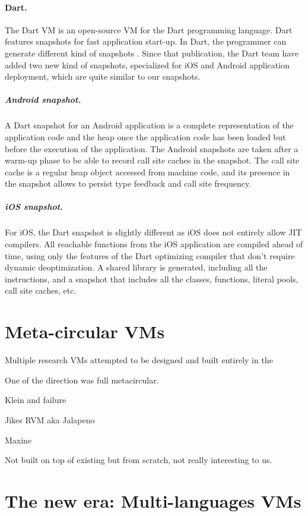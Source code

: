 \documentclass[a4paper,12pt,twoside]{../includes/ThesisStyle}
\begin{document}
\paragraph{Dart.}
The Dart VM is an open-source VM for the Dart programming language. Dart features snapshots for fast application start-up. In Dart, the programmer can generate different kind of snapshots \cite{Anna13a}. Since that publication, the Dart team have added two new kind of snapshots, specialized for iOS and Android application deployment, which are quite similar to our snapshots.

\subparagraph{Android snapshot.} A Dart snapshot for an Android application is a complete representation of the application code and the heap once the application code has been loaded but before the execution of the application. The Android snapshots are taken after a warm-up phase to be able to record call site caches in the snapshot. The call site cache is a regular heap object accessed from machine code, and its presence in the snapshot allows to persist type feedback and call site frequency.

\subparagraph{iOS snapshot.} For iOS, the Dart snapshot is slightly different as iOS does not entirely allow JIT compilers. All reachable functions from the iOS application are compiled ahead of time, using only the features of the Dart optimizing compiler that don't require dynamic deoptimization. A shared library is generated, including all the instructions, and a snapshot that includes all the classes, functions, literal pools, call site caches, etc.

\section{Meta-circular VMs}

Multiple research VMs attempted to be designed and built entirely in the 

One of the direction was full metacircular.

Klein and failure ~\cite{Unga05b}

Jikes RVM aka Jalapeno \cite{Alp99a}

Maxine ~\cite{Wimm13a}

Not built on top of existing but from scratch, not really interesting to us.

\section{The new era: Multi-languages VMs}
\end{document}
